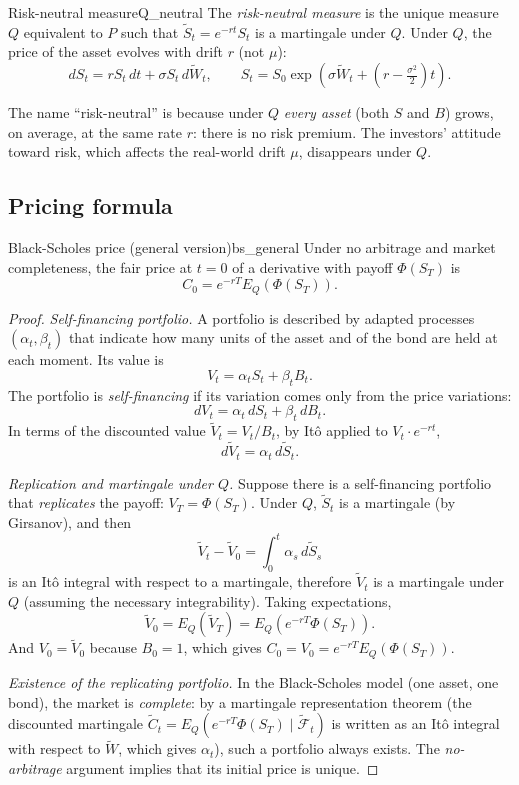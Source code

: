 \documentclass[11pt, a4paper]{article}
\begin{document}
\begin{definicion}{Risk-neutral measure}{Q_neutral}
The \emph{risk-neutral measure} is the unique measure $Q$ equivalent to $P$ such that
$\widetilde{S}_t = e^{-rt} S_t$ is a martingale under $Q$. Under $Q$, the price of the asset evolves
with drift $r$ (not $\mu$):
$$ dS_t = r S_t \, dt + \sigma S_t \, d\widetilde{W}_t, \qquad S_t = S_0 \exp\!\left(\sigma
\widetilde{W}_t + (r - \tfrac{\sigma^2}{2}) t\right). $$
\end{definicion}

\obs The name ``risk-neutral'' is because under $Q$ \emph{every asset} (both $S$ and $B$)
grows, on average, at the same rate $r$: there is no risk premium. The investors' attitude
toward risk, which affects the real-world drift $\mu$, disappears under $Q$.

\subsection{Pricing formula}

\begin{teorema}{Black-Scholes price (general version)}{bs_general}
Under no arbitrage and market completeness, the fair price at $t = 0$ of a derivative with payoff
$\Phi(S_T)$ is
$$ C_0 = e^{-rT} E_Q(\Phi(S_T)). $$
\end{teorema}

\begin{proof}
\textit{Self-financing portfolio.} A portfolio is described by adapted processes $(\alpha_t, \beta_t)$
that indicate how many units of the asset and of the bond are held at each moment. Its value
is
$$ V_t = \alpha_t S_t + \beta_t B_t. $$
The portfolio is \emph{self-financing} if its variation comes only from the price variations:
$$ dV_t = \alpha_t \, dS_t + \beta_t \, dB_t. $$
In terms of the discounted value $\widetilde{V}_t = V_t / B_t$, by Itô applied to
$V_t \cdot e^{-rt}$,
$$ d\widetilde{V}_t = \alpha_t \, d\widetilde{S}_t. $$

\textit{Replication and martingale under $Q$.} Suppose there is a self-financing portfolio that
\emph{replicates} the payoff: $V_T = \Phi(S_T)$. Under $Q$, $\widetilde{S}_t$ is a martingale (by
Girsanov), and then
$$ \widetilde{V}_t - \widetilde{V}_0 = \int_0^t \alpha_s \, d\widetilde{S}_s $$
is an Itô integral with respect to a martingale, therefore $\widetilde{V}_t$ is a martingale
under $Q$ (assuming the necessary integrability). Taking expectations,
$$ \widetilde{V}_0 = E_Q(\widetilde{V}_T) = E_Q(e^{-rT} \Phi(S_T)). $$
And $V_0 = \widetilde{V}_0$ because $B_0 = 1$, which gives $C_0 = V_0 = e^{-rT} E_Q(\Phi(S_T))$.

\textit{Existence of the replicating portfolio.} In the Black-Scholes model (one asset, one bond),
the market is \emph{complete}: by a martingale representation theorem (the discounted
martingale $\widetilde{C}_t = E_Q(e^{-rT} \Phi(S_T) \mid \widetilde{\mathcal{F}}_t)$ is written as an
Itô integral with respect to $\widetilde{W}$, which gives $\alpha_t$), such a portfolio always exists.
The \emph{no-arbitrage} argument implies that its initial price is unique.
\end{proof}
\end{document}
